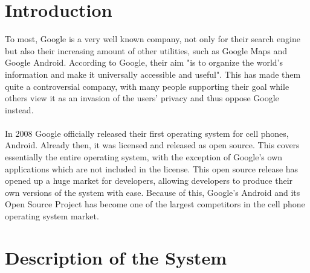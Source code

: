 \documentclass[conference]{IEEEtran}
\begin{document}
\section{Introduction}
\label{intro}


To most, Google\cite{Android} is a very well known company, not only for their search engine but also their increasing amount of other utilities, such as Google Maps and Google Android. According to Google, their aim "is to organize the world’s information and make it universally accessible and useful".\cite{Goggin} This has made them quite a controversial company, with many people supporting their goal while others view it as an invasion of the users' privacy and thus oppose Google instead. 
\\\\In 2008 Google officially released their first operating system for cell phones, Android.\cite{Android-release} Already then, it was licensed and released as open source.\cite{Android} This covers essentially the entire operating system, with the exception of Google's own applications which are not included in the license. This open source release has opened up a huge market for developers, allowing developers to produce their own versions of the system with ease. Because of this, Google's Android and its Open Source Project has become one of the largest competitors in the cell phone operating system market.\cite{Android-market}

\section{Description of the System}
\label{system}
\end{document}
